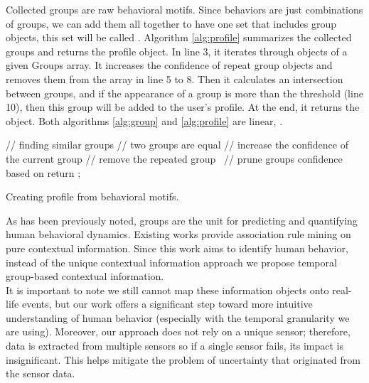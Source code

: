 \documentclass{sig-alternate}
\begin{document}
Collected groups are raw behavioral motifs. Since behaviors are just combinations of groups, we can add them all together to have one set that includes group objects, this set will be called . Algorithm \ref{alg:profile} summarizes the collected groups and returns the profile object. In line 3, it iterates through objects of a given Groups array. It increases the confidence of repeat group objects and removes them from the array in line 5 to 8. Then it calculates an intersection between groups, and if the appearance of a group is more than the  threshold (line 10), then this group will be added to the user's profile. At the end, it returns the  object. Both algorithms \ref{alg:group} and \ref{alg:profile} are linear, .\\
\begin{algorithm2e}[htb] 
\scriptsize
 \KwData{, }
 \KwResult{}
 \;
 // finding similar groups \;
 \While{() } {
       // two groups are equal \;
		\If { ()} {
			// increase the confidence of the current group
			 \;
			// remove the repeated group\
			 \;
		}
	}
  // prune groups confidence based on  \;
  \While {() } {
  	\If { ()} {
		 \;		  	 
  	 } 
  }
 return ;
\caption{\footnotesize Creating profile from behavioral motifs.}\label{alg:profile}
\end{algorithm2e}
\normalsize
As has been previously noted, groups are the unit for predicting and quantifying human behavioral dynamics. Existing works \cite{ace, mobileminer} provide association rule mining on pure contextual information. Since this work aims to identify human behavior, instead of the unique contextual information approach we propose temporal group-based contextual information.  \\
It is important to note we still cannot map these information objects onto real-life events, but our work offers a significant step toward more intuitive understanding of human behavior (especially with the temporal granularity we are using). Moreover, our approach does not rely on a unique sensor; therefore, data is extracted from multiple sensors so if a single sensor fails, its impact is insignificant. This helps mitigate the problem of uncertainty that originated from the sensor data.
\vspace{-0.2cm}
\end{document}

